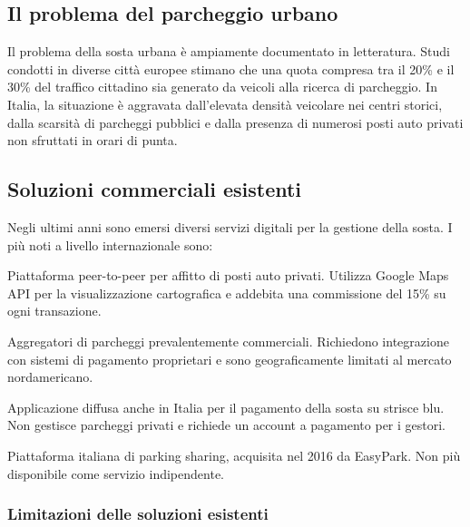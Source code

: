 \documentclass[12pt, a4paper]{article}
\begin{document}
\subsection{Il problema del parcheggio urbano}

Il problema della sosta urbana è ampiamente documentato in letteratura. Studi condotti in
diverse città europee stimano che una quota compresa tra il 20\% e il 30\% del traffico
cittadino sia generato da veicoli alla ricerca di parcheggio. In Italia, la
situazione è aggravata dall'elevata densità veicolare nei centri storici, dalla scarsità di
parcheggi pubblici e dalla presenza di numerosi posti auto privati non sfruttati in orari di
punta.

\subsection{Soluzioni commerciali esistenti}

Negli ultimi anni sono emersi diversi servizi digitali per la gestione della sosta. I più noti
a livello internazionale sono:

\begin{description}[leftmargin=0pt]
    \item[\textbf{JustPark} (UK)] Piattaforma peer-to-peer per affitto di posti auto privati.
    Utilizza Google Maps API per la visualizzazione cartografica e addebita una commissione
    del 15\% su ogni transazione.

    \item[\textbf{SpotHero / ParkWhiz} (USA)] Aggregatori di parcheggi prevalentemente
    commerciali. Richiedono integrazione con sistemi di pagamento proprietari e sono
    geograficamente limitati al mercato nordamericano.

    \item[\textbf{EasyPark}] Applicazione diffusa anche in Italia per il pagamento della
    sosta su strisce blu. Non gestisce parcheggi privati e richiede un account a pagamento
    per i gestori.

    \item[\textbf{ParkU}] Piattaforma italiana di parking sharing, acquisita nel 2016
    da EasyPark. Non più disponibile come servizio indipendente.
\end{description}

\subsubsection{Limitazioni delle soluzioni esistenti}
\end{document}
